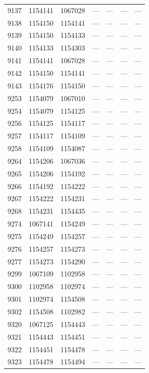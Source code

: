 \begin{longtable}{lcccccc}
9137 & 1154141 & 1067028 & --- & --- & --- & --- \\
9138 & 1154150 & 1154141 & --- & --- & --- & --- \\
9139 & 1154150 & 1154133 & --- & --- & --- & --- \\
9140 & 1154133 & 1154303 & --- & --- & --- & --- \\
9141 & 1154141 & 1067028 & --- & --- & --- & --- \\
9142 & 1154150 & 1154141 & --- & --- & --- & --- \\
9143 & 1154176 & 1154150 & --- & --- & --- & --- \\
9253 & 1154079 & 1067010 & --- & --- & --- & --- \\
9254 & 1154079 & 1154125 & --- & --- & --- & --- \\
9256 & 1154125 & 1154117 & --- & --- & --- & --- \\
9257 & 1154117 & 1154109 & --- & --- & --- & --- \\
9258 & 1154109 & 1154087 & --- & --- & --- & --- \\
9264 & 1154206 & 1067036 & --- & --- & --- & --- \\
9265 & 1154206 & 1154192 & --- & --- & --- & --- \\
9266 & 1154192 & 1154222 & --- & --- & --- & --- \\
9267 & 1154222 & 1154231 & --- & --- & --- & --- \\
9268 & 1154231 & 1154435 & --- & --- & --- & --- \\
9274 & 1067141 & 1154249 & --- & --- & --- & --- \\
9275 & 1154249 & 1154257 & --- & --- & --- & --- \\
9276 & 1154257 & 1154273 & --- & --- & --- & --- \\
9277 & 1154273 & 1154290 & --- & --- & --- & --- \\
9299 & 1067109 & 1102958 & --- & --- & --- & --- \\
9300 & 1102958 & 1102974 & --- & --- & --- & --- \\
9301 & 1102974 & 1154508 & --- & --- & --- & --- \\
9302 & 1154508 & 1102982 & --- & --- & --- & --- \\
9320 & 1067125 & 1154443 & --- & --- & --- & --- \\
9321 & 1154443 & 1154451 & --- & --- & --- & --- \\
9322 & 1154451 & 1154478 & --- & --- & --- & --- \\
9323 & 1154478 & 1154494 & --- & --- & --- & --- \\

\end{longtable}

